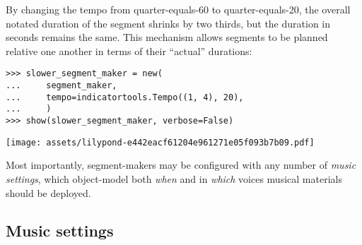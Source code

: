 \noindent By changing the tempo from quarter-equals-60 to quarter-equals-20,
the overall notated duration of the segment shrinks by two thirds, but the
duration in seconds remains the same. This mechanism allows segments to be
planned relative one another in terms of their \enquote{actual} durations:

\begin{comment}
<abjad>[stylesheet=../consort.ily]
slower_segment_maker = new(
    segment_maker,
    tempo=indicatortools.Tempo((1, 4), 20),
    )
show(slower_segment_maker, verbose=False)
</abjad>
\end{comment}

\begin{abjadbookoutput}
\begin{singlespacing}
\vspace{-0.5\baselineskip}
\begin{verbatim}
>>> slower_segment_maker = new(
...     segment_maker,
...     tempo=indicatortools.Tempo((1, 4), 20),
...     )
>>> show(slower_segment_maker, verbose=False)
\end{verbatim}
\noindent\texttt{[image: assets/lilypond-e442eacf61204e961271e05f093b7b09.pdf]}
\end{singlespacing}
\end{abjadbookoutput}

\noindent Most importantly, segment-makers may be configured with any number of
\emph{music settings}, which object-model both \emph{when} and in \emph{which}
voices musical materials should be deployed.

\subsection{Music settings}
\label{ssec:music-settings}

